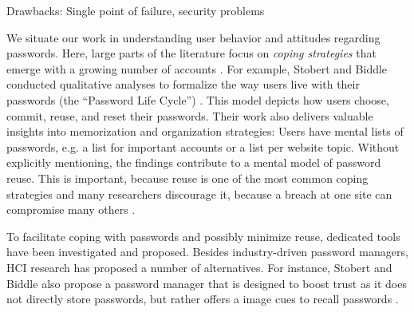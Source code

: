 	Drawbacks: Single point of failure, security problems 
	
	We situate our work in understanding user behavior and attitudes regarding passwords. Here, large parts of the literature focus on \textit{coping strategies} that emerge with a growing number of accounts \cite{Florencio2007LargeScaleStudyPasswordHabits, Florencio2014PasswordPortfoliosFiniteUser}. For example, Stobert and Biddle conducted qualitative analyses to formalize the way users live with their passwords (the ``Password Life Cycle'') \cite{Stobert2014PasswordLifeCycle}. This model depicts how users choose, commit, reuse, and reset their passwords. Their work also delivers valuable insights into memorization and organization strategies: Users have mental lists of passwords, e.g. a list for important accounts or a list per website topic. Without explicitly mentioning, the findings contribute to a mental model of password reuse. This is important, because reuse is one of the most common coping strategies \cite{Das2014TangledWeb, Gaw2006PasswordManagement, Hayashi2011DiaryStudyPWs} and many researchers discourage it, because a breach at one site can compromise many others \cite{Bonneau2012ScienceOfGuessing, Komanduri2011OfPasswordsAndPeople}. 
	
	To facilitate coping with passwords and possibly minimize reuse, dedicated tools have been investigated and proposed. Besides industry-driven password managers, HCI research has proposed a number of alternatives. For instance, Stobert and Biddle also propose a password manager that is designed to boost trust as it does not directly store passwords, but rather offers a image cues to recall passwords \cite{Stobert2014PWMThatDoesntRemember}. 
	
	
	\cite{Bojinov2010KamouflagePWM}
	
	\cite{Fagan2017UsersConsiderationsPWMs}